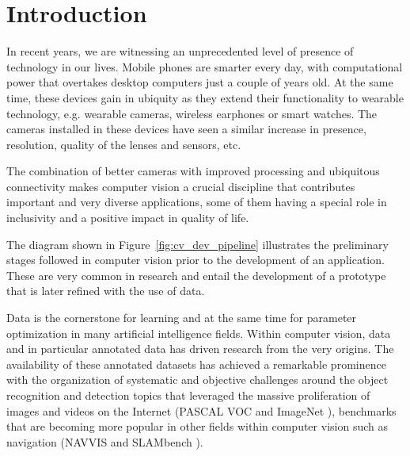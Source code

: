 \chapter{Introduction}\label{ch:introduction}

In recent years, we are witnessing an unprecedented level of presence of technology in our lives. Mobile phones are smarter every day, with computational power that overtakes desktop computers just a couple of years old. At the same time, these devices gain in ubiquity as they extend their functionality to wearable technology, e.g. wearable cameras, wireless earphones or smart watches. The cameras installed in these devices have seen a similar increase in presence, resolution, quality of the lenses and sensors, etc.

The combination of better cameras with improved processing and ubiquitous connectivity makes computer vision a crucial discipline that contributes important and very diverse applications, some of them having a special role in inclusivity and a positive impact in quality of life.

The diagram shown in Figure~\ref{fig:cv_dev_pipeline} illustrates the preliminary stages followed in computer vision prior to the development of an application. These are very common in research and entail the development of a prototype that is later refined with the use of data. 

Data is the cornerstone for learning and at the same time for parameter optimization in many artificial intelligence fields. Within computer vision, data and in particular annotated data has driven research from the very origins. The availability of these annotated datasets has achieved a remarkable prominence with the organization of systematic and objective challenges around the object recognition and detection topics that leveraged the massive proliferation of images and videos on the Internet (PASCAL VOC \cite{everingham2010pascal} and ImageNet \citep{Deng2009}), benchmarks that are becoming  more popular in other fields within computer vision such as navigation (NAVVIS \cite{Huitl2012} and SLAMbench \cite{nardi2014introducing}).

